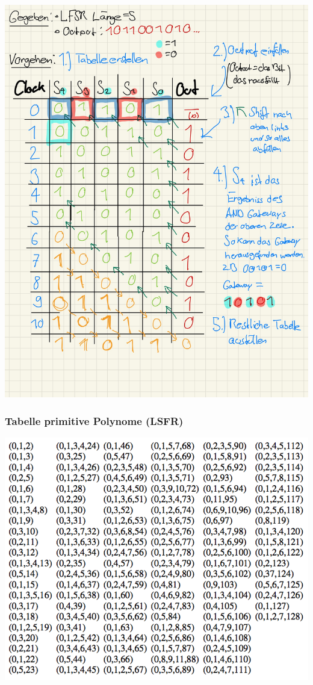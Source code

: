 \documentclass[11pt]{article}
\begin{document}
\includegraphics{img/psol2.1.jpg} \\

\subsubsection{Tabelle primitive Polynome (LSFR)}\label{tabelle-primitive-polynome-lsfr}

\begin{center}
	\includegraphics{img/lsfr_primitive_polynome.png}
\end{center}
\end{document}
